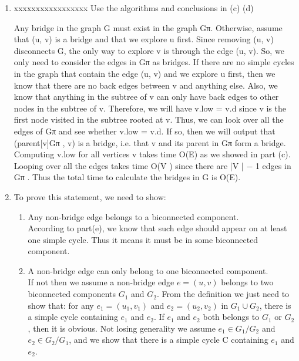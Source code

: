 \documentclass[paper=a4, fontsize=11pt]{scrartcl} %
\numberwithin{equation}{section} %
\numberwithin{figure}{section} %
\numberwithin{table}{section} %
\begin{document}
\begin{enumerate}[label={2.(\alph*)}]
  \item xxxxxxxxxxxxxxxxx
Use the algorithms and conclusions in (c)  (d)

Any bridge in the graph G must exist in the graph Gπ. Otherwise, assume that (u, v) is a bridge and that we explore u first. Since removing (u, v) disconnects G, the only way to explore v is through the edge (u, v). So, we only need to consider the edges in Gπ as bridges. If there are no simple cycles in the graph that contain the edge (u, v) and we explore u first, then we know that there are no back edges between v and anything else. Also, we know that anything
in the subtree of v can only have back edges to other nodes in the subtree of v. Therefore, we will have v.low = v.d since v is the first node visited in the subtree rooted at v. Thus, we can look over all the edges of Gπ and see whether v.low = v.d. If so, then we will output that (parent[v]Gπ , v) is a bridge, i.e. that v and its parent in Gπ form a bridge. Computing v.low for all vertices v takes time O(E) as we showed in part (c). Looping over all the edges takes time O(V ) since there are |V | − 1 edges in Gπ . Thus the total time to calculate the bridges in G is O(E).


  \item 

  To prove this statement, we need to show:
  \begin{enumerate}
    \item Any non-bridge edge belongs to a biconnected component.\\
      According to part(e), we know that such edge should appear on at least one simple cycle. Thus it means it must be in some biconnected component.
    \item A non-bridge edge can only belong to one biconnected component.\\
      If not then we assume a non-bridge edge $e=(u,v)$ belongs to two
      biconnected components $G_1$ and $G_2$. From the definition we just need
      to show that: for any $e_1=(u_1,v_1)$ and $e_2=(u_2,v_2)$ in $G_1 \cup G_2$, there is a
      simple cycle containing $e_1$ and $e_2$. If $e_1$ and $e_2$ both belongs
      to $G_1$ or $G_2$, then it is obvious.  Not losing generality we assume
      $e_1 \in G_1/G_2$ and $e_2 \in G_2/G_1$, and we show that there is a
      simple cycle C containing $e_1$ and $e_2$.\\


\end{enumerate}
\end{enumerate}
\end{document}
